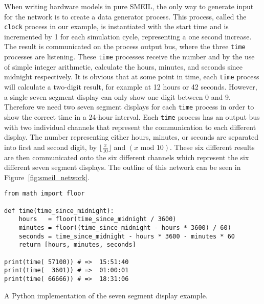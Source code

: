 When writing hardware models in pure SMEIL, the only way to generate input for the network is to create a data generator process. This process, called the \texttt{clock} process in our example, is instantiated with the start time and is incremented by 1 for each simulation cycle, representing a one second increase. The result is communicated on the process output bus, where the three \texttt{time} processes are listening. These \texttt{time} processes receive the number and by the use of simple integer arithmetic, calculate the hours, minutes, and seconds since midnight respectively. It is obvious that at some point in time, each \texttt{time} process will calculate a two-digit result, for example at 12 hours or 42 seconds. However, a single seven segment display can only show one digit between 0 and 9. Therefore we need two seven segment displays for each \texttt{time} process in order to show the correct time in a 24-hour interval. Each \texttt{time} process has an output bus with two individual channels that represent the communication to each different display. The number representing either hours, minutes, or seconds are separated into first and second digit, by $\lfloor \frac{x}{10} \rfloor$ and $(x \text{ mod } 10)$. These six different results are then communicated onto the six different channels which represent the six different seven segment displays.
The outline of this network can be seen in Figure~\ref{fig:smeil_network}.
\begin{listing}
\begin{verbatim}
from math import floor

def time(time_since_midnight):
    hours   = floor(time_since_midnight / 3600)
    minutes = floor((time_since_midnight - hours * 3600) / 60)
    seconds = time_since_midnight - hours * 3600 - minutes * 60
    return [hours, minutes, seconds]

print(time( 57100)) # =>  15:51:40
print(time(  3601)) # =>  01:00:01
print(time( 66666)) # =>  18:31:06
\end{verbatim}
\caption{A Python implementation of the seven segment display example.}
\label{lst:python}
\end{listing}
